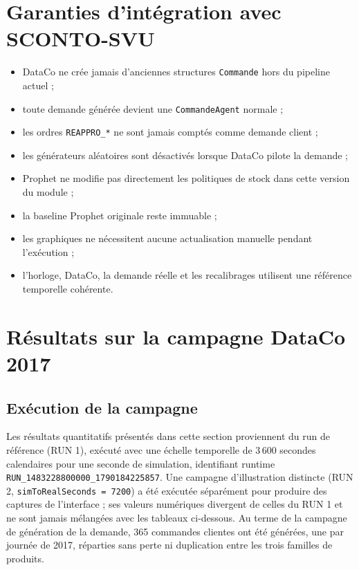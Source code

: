 \documentclass[11pt,a4paper]{article}
\newcommand{\code}[1]{\texttt{#1}}
\begin{document}
\section{Garanties d'intégration avec SCONTO-SVU}

\begin{itemize}[leftmargin=1.5em]
  \item DataCo ne crée jamais d'anciennes structures \code{Commande} hors du pipeline actuel ;
  \item toute demande générée devient une \code{CommandeAgent} normale ;
  \item les ordres \code{REAPPRO\_*} ne sont jamais comptés comme demande client ;
  \item les générateurs aléatoires sont désactivés lorsque DataCo pilote la demande ;
  \item Prophet ne modifie pas directement les politiques de stock dans cette version du module ;
  \item la baseline Prophet originale reste immuable ;
  \item les graphiques ne nécessitent aucune actualisation manuelle pendant l'exécution ;
  \item l'horloge, DataCo, la demande réelle et les recalibrages utilisent une référence temporelle cohérente.
\end{itemize}

\section{Résultats sur la campagne DataCo 2017}
\label{sec:resultats-dataco-2017}

\subsection{Exécution de la campagne}

Les résultats quantitatifs présentés dans cette section proviennent du run de référence (RUN 1), exécuté avec une échelle temporelle de 3\,600 secondes calendaires pour une seconde de simulation, identifiant runtime \code{RUN\_1483228800000\_1790184225857}. Une campagne d'illustration distincte (RUN 2, \code{simToRealSeconds = 7200}) a été exécutée séparément pour produire des captures de l'interface ; ses valeurs numériques divergent de celles du RUN 1 et ne sont jamais mélangées avec les tableaux ci-dessous. Au terme de la campagne de génération de la demande, 365 commandes clientes ont été générées, une par journée de 2017, réparties sans perte ni duplication entre les trois familles de produits.
\end{document}
